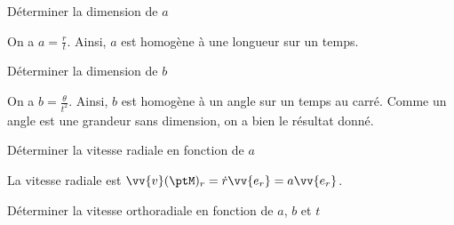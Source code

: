 
\begin{enonce}
	Déterminer la dimension de $a$
\end{enonce}


\begin{corrige}
	On a $a=\frac{r}{t}$. Ainsi, $a$ est homogène à une longueur sur un temps.
\end{corrige}




\begin{enonce}
	Déterminer la dimension de $b$
\end{enonce}


\begin{corrige}
	On a $b=\frac{\theta}{t^2}$. Ainsi, $b$ est homogène à un angle sur un temps au carré. Comme un angle est une grandeur sans dimension, on a bien le résultat donné. 
\end{corrige}




\begin{enonce}
	Déterminer la vitesse radiale en fonction de $a$
\end{enonce}


\begin{corrige}
	La vitesse radiale est $\vv{v}(\ptM)_r=\dot{r} \vv{e_r}=a \vv{e_r}$.
\end{corrige}




\begin{enonce}
	Déterminer la vitesse orthoradiale  en fonction de $a$, $b$ et $t$
\end{enonce}

